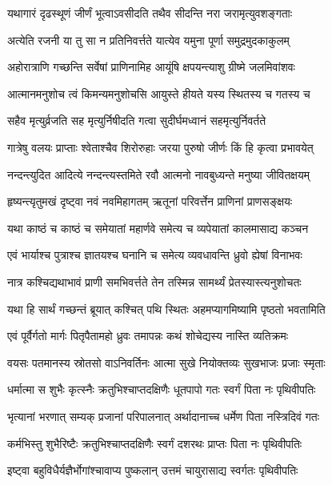 \twolineshloka
{यथागारं दृढस्थूणं जीर्णं भूत्वाऽवसीदति}
{तथैव सीदन्ति नरा जरामृत्युवशङ्गताः} %

\twolineshloka
{अत्येति रजनी या तु सा न प्रतिनिवर्त्तते}
{यात्येव यमुना पूर्णा समुद्रमुदकाकुलम्} %

\twolineshloka
{अहोरात्राणि गच्छन्ति सर्वेषां प्राणिनामिह}
{आयूंषि क्षपयन्त्याशु ग्रीष्मे जलमिवांशवः} %

\twolineshloka
{आत्मानमनुशोच त्वं किमन्यमनुशोचसि}
{आयुस्ते हीयते यस्य स्थितस्य च गतस्य च} %

\twolineshloka
{सहैव मृत्युर्व्रजति सह मृत्युर्निषीदति}
{गत्वा सुदीर्घमध्वानं सहमृत्युर्निवर्तते} %

\twolineshloka
{गात्रेषु वलयः प्राप्ताः श्वेताश्चैव शिरोरुहाः}
{जरया पुरुषो जीर्णः किं हि कृत्वा प्रभावयेत्} %

\twolineshloka
{नन्दन्त्युदित आदित्ये नन्दन्त्यस्तमिते रवौ}
{आत्मनो नावबुध्यन्ते मनुष्या जीवितक्षयम्} %

\twolineshloka
{हृष्यन्त्यृतुमखं दृष्ट्वा नवं नवमिहागतम्}
{ऋतूनां परिवर्त्तेन प्राणिनां प्राणसङ्क्षयः} %

\twolineshloka
{यथा काष्ठं च काष्ठं च समेयातां महार्णवे}
{समेत्य च व्यपेयातां कालमासाद्य कञ्चन} %

\twolineshloka
{एवं भार्याश्च पुत्राश्च ज्ञातयश्च घनानि च}
{समेत्य व्यवधावन्ति ध्रुवो ह्येषां विनाभवः} %

\twolineshloka
{नात्र कश्चिद्यथाभावं प्राणी समभिवर्त्तते}
{तेन तस्मिन्न सामर्थ्यं प्रेतस्यास्त्यनुशोचतः} %

\twolineshloka
{यथा हि सार्थं गच्छन्तं ब्रूयात् कश्चित् पथि स्थितः}
{अहमप्यागमिष्यामि पृष्ठतो भवतामिति} %

\twolineshloka
{एवं पूर्वैर्गतो मार्गः पितृपैतामहो ध्रुवः}
{तमापन्नः कथं शोचेद्यस्य नास्ति व्यतिक्रमः} %

\twolineshloka
{वयसः पतमानस्य स्रोतसो वाऽनिवर्तिनः}
{आत्मा सुखे नियोक्तव्यः सुखभाजः प्रजाः स्मृताः} %

\twolineshloka
{धर्मात्मा स शुभैः कृत्स्नैः क्रतुभिश्चाप्तदक्षिणैः}
{धूतपापो गतः स्वर्गं पिता नः पृथिवीपतिः} %

\twolineshloka
{भृत्यानां भरणात् सम्यक् प्रजानां परिपालनात्}
{अर्थादानाच्च धर्मेण पिता नस्त्रिदिवं गतः} %

\twolineshloka
{कर्मभिस्तु शुभैरिष्टैः क्रतुभिश्चाप्तदक्षिणैः}
{स्वर्गं दशरथः प्राप्तः पिता नः पृथिवीपतिः} %

\twolineshloka
{इष्ट्वा बहुविधैर्यज्ञैर्भोगांश्चावाप्य पुष्कलान्}
{उत्तमं चायुरासाद्य स्वर्गतः पृथिवीपतिः} %

